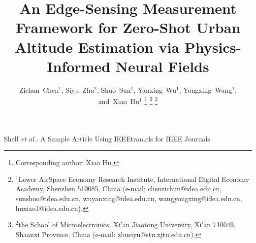 \documentclass[lettersize,journal]{IEEEtran}
\begin{document}
\title{
An Edge-Sensing Measurement Framework for Zero-Shot Urban Altitude Estimation via Physics-Informed Neural Fields
}

\author{
        Zichun~Chen$^{1}$,
        Siyu~Zhu$^{2}$,
        Shuo~Sun$^{1}$,
        Yanxing~Wu$^{1}$,
        Yongxing~Wang$^{1}$,
        and~Xiao~Hu$^{1}$
\thanks{Corresponding author: Xiao Hu.}
\thanks{$^{1}$Lower AirSpace Economy Research Institute, International Digital Economy Academy, Shenzhen 510085, China (e-mail: chenzichun@idea.edu.cn, sunshuo@idea.edu.cn, wuyanxing@idea.edu.cn, wangyongxing@idea.edu.cn, huxiao1@idea.edu.cn).}
\thanks{$^{2}$the School of Microelectronics, Xi'an Jiaotong University, Xi'an 710049, Shaanxi Province, China (e-mail: zhusiyu@stu.xjtu.edu.cn).
}
}

%
{Shell \MakeLowercase{\textit{et al.}}: A Sample Article Using IEEEtran.cls for IEEE Journals}


\maketitle
\end{document}
